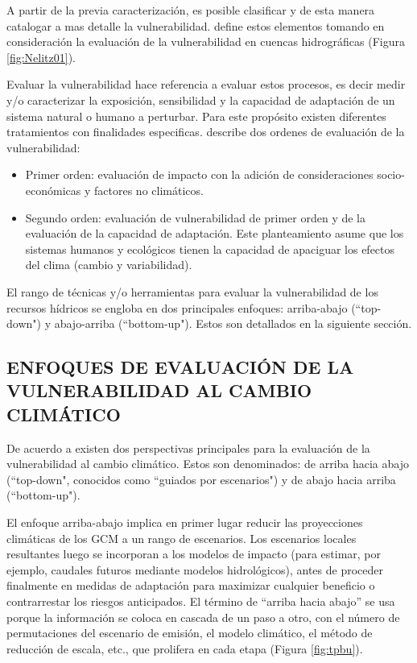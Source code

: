 \documentclass[12pt]{article}
\begin{document}
\clearpage
A partir de la previa caracterización, es posible clasificar y de esta manera catalogar a mas detalle la vulnerabilidad. \citet{nelitz2013tools} define estos elementos tomando en consideración la evaluación de la vulnerabilidad en cuencas hidrográficas (Figura \ref{fig:Nelitz01}).

Evaluar la vulnerabilidad hace referencia a evaluar estos procesos, es decir medir y/o caracterizar la exposición, sensibilidad y la capacidad de adaptación de un sistema natural o humano a perturbar. Para este propósito existen diferentes tratamientos con finalidades especificas. \citet{nelitz2013tools} describe dos ordenes de evaluación de la vulnerabilidad:

\begin{itemize}
    \item Primer orden: evaluación de impacto con la adición de consideraciones socio-económicas y factores no climáticos.
    \item Segundo orden: evaluación de vulnerabilidad de primer orden y de la evaluación de la capacidad de adaptación. Este planteamiento asume que los sistemas humanos y ecológicos tienen la capacidad de apaciguar los efectos del clima (cambio y variabilidad).
\end{itemize}

El rango de técnicas y/o herramientas para evaluar la vulnerabilidad de los recursos hídricos se engloba en dos principales enfoques: arriba-abajo (“top-down") y abajo-arriba (“bottom-up"). Estos son detallados en la siguiente sección.

\subsection{ENFOQUES DE EVALUACIÓN DE LA VULNERABILIDAD AL CAMBIO CLIMÁTICO}

De acuerdo a \citet{Wilby2010} existen dos perspectivas principales para la evaluación de la vulnerabilidad al cambio climático. Estos son denominados: de arriba hacia abajo (“top-down", conocidos como ``guiados por escenarios") y de abajo hacia arriba (“bottom-up").

\clearpage

\clearpage

El enfoque arriba-abajo implica en primer lugar reducir las proyecciones climáticas de los GCM a un rango de escenarios. Los escenarios locales resultantes luego se incorporan a los modelos de impacto (para estimar, por ejemplo, caudales futuros mediante modelos hidrológicos), antes de proceder finalmente en medidas de adaptación para maximizar cualquier beneficio o contrarrestar los riesgos anticipados. El término de “arriba hacia abajo” se usa porque la información se coloca en cascada de un paso a otro, con el número de permutaciones del escenario de emisión, el modelo climático, el método de reducción de escala, etc., que prolifera en cada etapa (Figura \ref{fig:tpbu}). 
\end{document}
